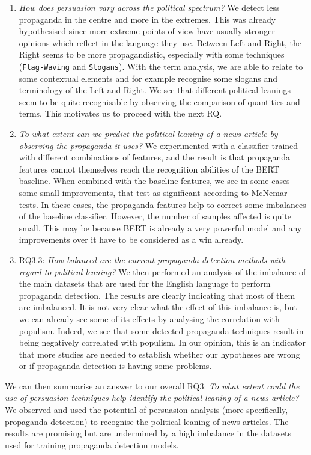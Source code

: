 \begin{enumerate}[label={\textbf{RQ3.\arabic*:}},leftmargin=2cm]
    \item \emph{How does persuasion vary across the political spectrum?} We detect less propaganda in the centre and more in the extremes. This was already hypothesised since more extreme points of view have usually stronger opinions which reflect in the language they use. Between Left and Right, the Right seems to be more propagandistic, especially with some techniques (\texttt{Flag-Waving} and \texttt{Slogans}). With the term analysis, we are able to relate to some contextual elements and for example recognise some slogans and terminology of the Left and Right. We see that different political leanings seem to be quite recognisable by observing the comparison of quantities and terms. This motivates us to proceed with the next RQ.
    \item \emph{To what extent can we predict the political leaning of a news article by observing the propaganda it uses?} We experimented with a classifier trained with different combinations of features, and the result is that propaganda features cannot themselves reach the recognition abilities of the BERT baseline. When combined with the baseline features, we see in some cases some small improvements, that test as significant according to McNemar tests. In these cases, the propaganda features help to correct some imbalances of the baseline classifier. However, the number of samples affected is quite small. This may be because BERT is already a very powerful model and any improvements over it have to be considered as a win already.
    \item RQ3.3: \emph{How balanced are the current propaganda detection methods with regard to political leaning?} We then performed an analysis of the imbalance of the main datasets that are used for the English language to perform propaganda detection. The results are clearly indicating that most of them are imbalanced. It is not very clear what the effect of this imbalance is, but we can already see some of its effects by analysing the correlation with populism. Indeed, we see that some detected propaganda techniques result in being negatively correlated with populism. In our opinion, this is an indicator that more studies are needed to establish whether our hypotheses are wrong or if propaganda detection is having some problems.
\end{enumerate}


We can then summarise an answer to our overall RQ3: \emph{To what extent could the use of persuasion techniques help identify the political leaning of a news article?}
We observed and used the potential of persuasion analysis (more specifically, propaganda detection) to recognise the political leaning of news articles. The results are promising but are undermined by a high imbalance in the datasets used for training propaganda detection models.



